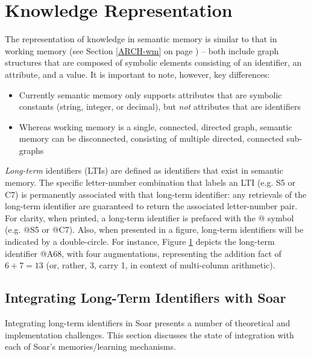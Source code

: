 \section{Knowledge Representation}
\label{SMEM-kr}

The representation of knowledge in semantic memory is similar to that in working memory (see Section \ref{ARCH-wm} on page \pageref{ARCH-wm}) -- both include graph structures that are composed of symbolic elements consisting of an identifier, an attribute, and a value. 
It is important to note, however, key differences:

\begin{itemize}

\item 
Currently semantic memory only supports attributes that are symbolic constants (string, integer, or decimal), but \emph{not} attributes that are identifiers

\item 
Whereas working memory is a single, connected, directed graph, semantic memory can be disconnected, consisting of multiple directed, connected sub-graphs

\end{itemize}

\emph{Long-term} identifiers (LTIs) are defined as identifiers that exist in semantic memory.
The specific letter-number combination that labels an LTI (e.g. S5 or C7) is permanently associated with that long-term identifier: any retrievals of the long-term identifier are guaranteed to return the associated letter-number pair.  
For clarity, when printed, a long-term identifier is prefaced with the {@} symbol (e.g. {@}S5 or {@}C7). 
Also, when presented in a figure, long-term identifiers will be indicated by a double-circle. 
For instance, Figure \ref{fig:smem-concept} depicts the long-term identifier {@}A68, with four augmentations, representing the addition fact of ${6+7=13}$ (or, rather, 3, carry 1, in context of multi-column arithmetic).

\begin{figure}
\label{fig:smem-concept}
\end{figure}

\subsection{Integrating Long-Term Identifiers with Soar}
Integrating long-term identifiers in Soar presents a number of theoretical and implementation challenges.  
This section discusses the state of integration with each of Soar's memories/learning mechanisms.


